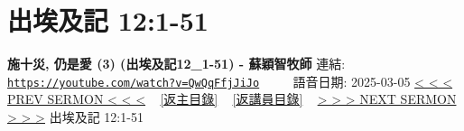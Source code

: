 \documentclass{book}
\begin{document}
\section{出埃及記 12:1-51}
\label{sec:QwQqFfjJiJo}
\textbf{施十災, 仍是愛 (3) (出埃及記12\_1-51) -  蘇穎智牧師}
\newline
\newline
連結: \href{https://youtube.com/watch?v=QwQqFfjJiJo}{\texttt{https://youtube.com/watch?v=QwQqFfjJiJo}} ~~~~ 語音日期: 2025-03-05
\newline
\newline
\hyperref[sec:8LlYAk0Xlok]{< < < PREV SERMON < < <}
~
\hyperlink{toc}{[返主目錄]}
~
\hyperref[ch:preacher9]{[返講員目錄]}
~
\hyperref[sec:AIPkez5NCbg]{> > > NEXT SERMON > > >}
\newline
\newline
出埃及記 12:1-51
\newline
\end{document}
